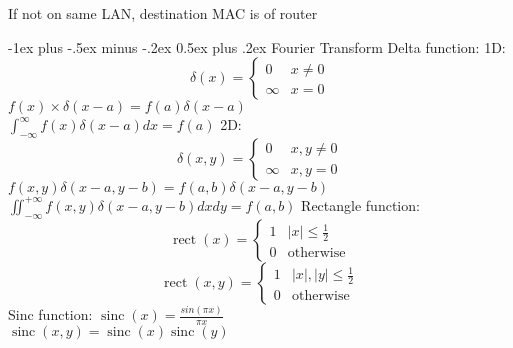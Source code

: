 \documentclass[dvipdfmx,a4paper,10pt,landscape]{article}
\makeatletter
\renewcommand{\section}{\@startsection{section}{1}{0mm}%
                                {-1ex plus -.5ex minus -.2ex}%
                                {0.5ex plus .2ex}%
                                {\normalfont\large\bfseries}}
\DeclareMathOperator{\sinc}{sinc}
\DeclareMathOperator{\rect}{rect}
\makeatother
\begin{document}
\begin{multicols}{3}
    If not on same LAN, destination MAC is of router


    \section{Fourier Transform}
    Delta function:
    1D:
    \begin{equation*}
        \delta(x)=
        \begin{cases}
            0      & x \neq 0 \\
            \infty & x = 0
        \end{cases}
    \end{equation*}
    $f(x)\times\delta(x-a)=f(a)\delta(x-a)$ \\
    $\int_{-\infty}^{\infty}f(x)\delta(x-a)dx=f(a)$
    2D:
    \begin{equation*}
        \delta(x,y)=
        \begin{cases}
            0      & x,y \neq 0 \\
            \infty & x,y = 0
        \end{cases}
    \end{equation*}
    $    f(x,y)\delta(x-a,y-b)=f(a,b)\delta(x-a,y-b)$ \\
    $\iint_{-\infty}^{+\infty}f(x,y)\delta(x-a,y-b)dxdy=f(a,b)
    $
    Rectangle function:
    \begin{equation*}
        \rect(x)   =
        \begin{cases}
            1 & |x|\leq\frac{1}{2} \\
            0 & \text{otherwise}
        \end{cases}
    \end{equation*}
    \begin{equation*}
        \rect(x,y) =
        \begin{cases}
            1 & |x|,|y|\leq\frac{1}{2} \\
            0 & \text{otherwise}
        \end{cases}
    \end{equation*}
    Sinc function:
    $
        \sinc(x)    =\frac{sin(\pi x)}{\pi x}     $                          \\
    $\sinc(x,y)  = \sinc(x)\sinc(y)
    $


\end{multicols}
\end{document}
